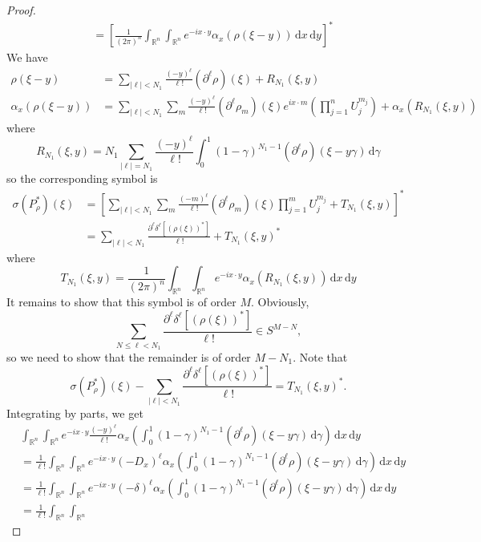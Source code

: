 \documentclass[10pt]{article}
\theoremstyle{remark}
\theoremstyle{definition}
\begin{document}
\begin{proof}
\begin{align*}
&= \left[\frac{1}{(2\pi)^n}\int_{\mathbb R^n}\!\int_{\mathbb R^n}\!
e^{-ix\cdot y}\alpha_x(\rho(\xi-y))\,\mathrm dx\,\mathrm dy\right]^*
\end{align*}
We have
\begin{align*}
\rho(\xi-y) &= \sum_{|\ell|<N_1}\frac{(-y)^{\ell}}{\ell!}
(\partial^{\ell}\rho)(\xi)+R_{N_1}(\xi,y) \\
\alpha_x(\rho(\xi-y)) &= \sum_{|\ell|<N_1}\sum_m
\frac{(-y)^{\ell}}{\ell!}(\partial^{\ell}\rho_m)(\xi)
e^{ix\cdot m}\left(\prod_{j=1}^nU_j^{m_j}\right)+\alpha_x(R_{N_1}(\xi,y))
\end{align*}
where
$$R_{N_1}(\xi,y)=N_1\sum_{|\ell|=N_1}\frac{(-y)^{\ell}}{\ell!}
\int_0^1\!(1-\gamma)^{N_1-1}(\partial^{\ell}\rho)(\xi-y\gamma)
\,\mathrm d\gamma$$
so the corresponding symbol is
\begin{align*}
\sigma(P_{\rho}^*)(\xi)
&= \left[\sum_{|\ell|<N_1}\sum_m\frac{(-m)^{\ell}}
{\ell!}(\partial^{\ell}\rho_m)(\xi)\prod_{j=1}^mU_j^{m_j}
+T_{N_1}(\xi,y)\right]^* \\
&= \sum_{|\ell|<N_1}\frac{\partial^{\ell}\delta^{\ell}[(\rho(\xi))^*]}
{\ell!}+T_{N_1}(\xi,y)^*
\end{align*}
where
$$T_{N_1}(\xi,y)=\frac{1}{(2\pi)^n}\int_{\mathbb R^n}\!\int_{\mathbb R^n}
e^{-ix\cdot y}\alpha_x(R_{N_1}(\xi,y))\,\mathrm dx\,\mathrm dy$$
It remains to show that this symbol is of order $M$.
Obviously,
$$\sum_{N\le\ell<N_1}\frac{\partial^{\ell}\delta^{\ell}[(\rho(\xi))^*]}
{\ell!}\in S^{M-N},$$
so we need to show that the remainder is of order $M-N_1$.
Note that $$\sigma(P_{\rho}^*)(\xi)
-\sum_{|\ell|<N_1}\frac{\partial^{\ell}\delta^{\ell}[(\rho(\xi))^*]}
{\ell!}=T_{N_1}(\xi,y)^*.$$
Integrating by parts, we get
\begin{align*}
&\int_{\mathbb R^n}\!\int_{\mathbb R^n}\!
e^{-ix\cdot y}\frac{(-y)^{\ell}}{\ell!}\alpha_x\left(
\int_0^1\!(1-\gamma)^{N_1-1}(\partial^{\ell}\rho)(\xi-y\gamma)
\,\mathrm d\gamma\right)\,\mathrm dx\,\mathrm dy \\
&= \frac{1}{\ell!}\int_{\mathbb R^n}\!\int_{\mathbb R^n}\!
e^{-ix\cdot y}(-D_x)^{\ell}\alpha_x\left(
\int_0^1\!(1-\gamma)^{N_1-1}(\partial^{\ell}\rho)(\xi-y\gamma)
\,\mathrm d\gamma\right)\,\mathrm dx\,\mathrm dy \\
&= \frac{1}{\ell!}\int_{\mathbb R^n}\!\int_{\mathbb R^n}\!
e^{-ix\cdot y}(-\delta)^{\ell}\alpha_x\left(
\int_0^1\!(1-\gamma)^{N_1-1}(\partial^{\ell}\rho)(\xi-y\gamma)
\,\mathrm d\gamma\right)\,\mathrm dx\,\mathrm dy \\
&= \frac{1}{\ell!}\int_{\mathbb R^n}\!\int_{\mathbb R^n}\!

\end{align*}
\end{proof}
\end{document}
